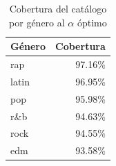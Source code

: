 \begin{table}[htbp]
  \centering
  \caption{Cobertura del catálogo por género al $\alpha$ óptimo}
  \label{tab:coverage_per_genre}
  \begin{tabular}{lr}
    \toprule
    Género & Cobertura \\
    \midrule
    rap & 97.16\% \\
    latin & 96.95\% \\
    pop & 95.98\% \\
    r\&b & 94.63\% \\
    rock & 94.55\% \\
    edm & 93.58\% \\
    \bottomrule
  \end{tabular}
\end{table}